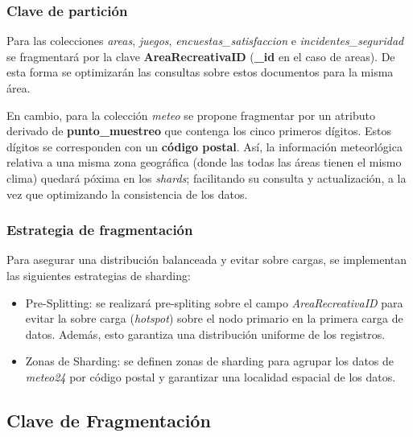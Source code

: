 \documentclass[]{article}
\begin{document}
\subsubsection{Clave de partición}
\label{subsubsec:particion_areas}

Para las colecciones \textit{areas}, \textit{juegos}, \textit{encuestas\_satisfaccion} e \textit{incidentes\_seguridad} se fragmentará por la clave \textbf{AreaRecreativaID} (\textbf{\_id} en el caso de areas). De esta forma se optimizarán las consultas sobre estos documentos para la misma área. 

En cambio, para la colección \textit{meteo} se propone fragmentar por un atributo derivado de \textbf{punto\_muestreo} que contenga los cinco primeros dígitos. Estos dígitos se corresponden con un \textbf{código postal}. Así, la información meteorlógica relativa a una misma zona geográfica (donde las todas las áreas tienen el mismo clima)  quedará póxima en los \textit{shards}; facilitando su consulta y actualización, a la vez que optimizando la consistencia de los datos.

\subsubsection{Estrategia de fragmentación}
\label{subsubsec:fragmentacion_areas}

Para asegurar una distribución balanceada y evitar sobre cargas, se implementan las siguientes estrategias de sharding:
\begin{itemize}
    \item Pre-Splitting: se realizará pre-spliting sobre el campo \textit{AreaRecreativaID} para evitar la sobre carga (\textit{hotspot}) sobre el nodo primario en la primera carga de datos. Además, esto garantiza una distribución uniforme de los registros.
    \item Zonas de Sharding: se definen zonas de sharding para agrupar los datos de \textit{meteo24} por código postal y garantizar una localidad espacial de los datos. %
\end{itemize}


\subsection{Clave de Fragmentación}
\label{subsec:fragmmentacion}
\end{document}
